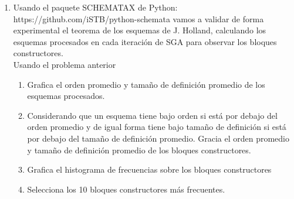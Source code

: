 \documentclass[10pt,letterpaper]{article}
\begin{document}
\begin{enumerate}
\begin{multicols}{2}
        \end{multicols}
    \clearpage
    \item Usando el paquete SCHEMATAX de Python: https://github.com/iSTB/python-schemata
          vamos a validar de forma experimental el teorema de los esquemas de J. Holland,
          calculando los esquemas procesados en cada iteración de SGA para observar los
          bloques constructores. \\
          Usando el problema anterior
        \begin{enumerate}
            \item Grafica el orden promedio y tamaño de definición promedio de
                  los esquemas procesados.
            \item Considerando que un esquema tiene bajo orden si está por debajo
                  del orden promedio y de igual forma tiene bajo tamaño de definición
                  si está por debajo del tamaño de definición promedio. Gracia el
                  orden promedio y tamaño de definición promedio de los bloques
                  constructores.
            \item Grafica el histograma de frecuencias sobre los bloques constructores
            \item Selecciona los 10 bloques constructores más frecuentes.
        \end{enumerate}
\end{enumerate}
\end{document}
